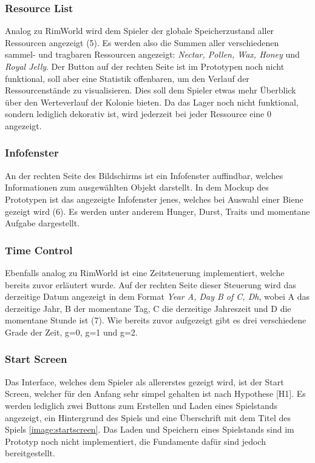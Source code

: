 \subsubsection{Resource List}
Analog zu RimWorld wird dem Spieler der globale Speicherzustand aller Ressourcen angezeigt (5). Es werden also die Summen aller verschiedenen sammel- und tragbaren Ressourcen angezeigt: \textit{Nectar, Pollen, Wax, Honey} und \textit{Royal Jelly}. Der Button auf der rechten Seite ist im Prototypen noch nicht funktional, soll aber eine Statistik offenbaren, um den Verlauf der Ressourcenstände zu visualisieren. Dies soll dem Spieler etwas mehr Überblick über den Werteverlauf der Kolonie bieten. Da das Lager noch nicht funktional, sondern lediglich dekorativ ist, wird jederzeit bei jeder Ressource eine 0 angezeigt.

\subsubsection{Infofenster}
An der rechten Seite des Bildschirms ist ein Infofenster auffindbar, welches Informationen zum ausgewählten Objekt darstellt. In dem Mockup des Prototypen ist das angezeigte Infofenster jenes, welches bei Auswahl einer Biene gezeigt wird (6). Es werden unter anderem Hunger, Durst, Traits und momentane Aufgabe dargestellt.

\subsubsection{Time Control}
Ebenfalls analog zu RimWorld ist eine Zeitsteuerung implementiert, welche bereits zuvor erläutert wurde. Auf der rechten Seite dieser Steuerung wird das derzeitige Datum angezeigt in dem Format \textit{Year A, Day B of C, Dh}, wobei A das derzeitige Jahr, B der momentane Tag, C die derzeitige Jahreszeit und D die momentane Stunde ist (7). Wie bereits zuvor aufgezeigt gibt es drei verschiedene Grade der Zeit, g=0, g=1 und g=2.

\subsubsection{Start Screen}
Das Interface, welches dem Spieler als allererstes gezeigt wird, ist der Start Screen, welcher für den Anfang sehr simpel gehalten ist nach Hypothese [H1]. Es werden lediglich zwei Buttons zum Erstellen und Laden eines Spielstands angezeigt, ein Hintergrund des Spiels und eine Überschrift mit dem Titel des Spiels \autoref{image:startscreen}. Das Laden und Speichern eines Spielstands sind im Prototyp noch nicht implementiert, die Fundamente dafür sind jedoch bereitgestellt.

